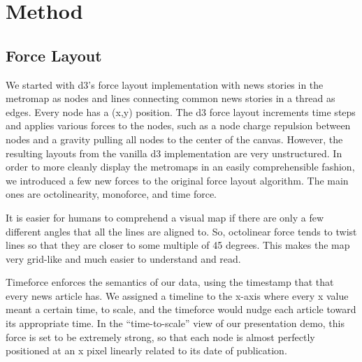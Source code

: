 \documentclass{chi2009}
\begin{document}
\section{Method}

\subsection{Force Layout}
We started with d3’s force layout implementation with news stories in the metromap as nodes and lines connecting common news stories in a thread as edges.  Every node has a (x,y) position.  The d3 force layout increments time steps and applies various forces to the nodes, such as a node charge repulsion between nodes and a gravity pulling all nodes to the center of the canvas.  However, the resulting layouts from the vanilla d3 implementation are very unstructured.  In order to more cleanly display the metromaps in an easily comprehensible fashion, we introduced a few new forces to the original force layout algorithm.  The main ones are octolinearity, monoforce, and time force.  

It is easier for humans to comprehend a visual map if there are only a few different angles that all the lines are aligned to.  So, octolinear force tends to twist lines so that they are closer to some multiple of 45 degrees.  This makes the map very grid-like and much easier to understand and read.  

Timeforce enforces the semantics of our data, using the timestamp that that every news article has.  We assigned a timeline to the x-axis where every x value meant a certain time, to scale, and the timeforce would nudge each article toward its appropriate time. In the “time-to-scale” view of our presentation demo, this force is set to be extremely strong, so that each node is almost perfectly positioned at an x pixel linearly related to its date of publication.
\end{document}
